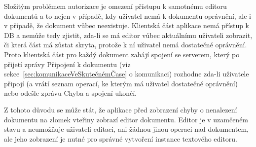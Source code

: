Složitým problémem autorizace je omezení přístupu k samotnému editoru dokumentů a to nejen v případě, kdy uživatel nemá k dokumentu oprávnění, ale i v případě, že dokument vůbec neexistuje.
Klientská část aplikace nemá přístup k DB a nemůže tedy zjistit, zda-li se má editor vůbec aktuálnímu uživateli zobrazit, či která část má zůstat skryta, protože k ní uživatel nemá dostatečné oprávnění.
Proto klientská část pro každý dokument zahájí spojení se serverem, který po přijetí zprávy Připojení k dokumentu (viz sekce~\ref{sec:komunikaceVeSkutečnémČase} o komunikaci) rozhodne zda-li uživatele připojí (a vrátí seznam operací, ke kterým má uživatel dostatečné oprávnění) nebo odešle zprávu Chyba a spojení ukončí.

Z tohoto důvodu se může stát, že aplikace před zobrazení chyby o nenalezení dokumentu na zlomek vteřiny zobrazí editor dokumentu.
Editor je v uzamčeném stavu a neumožňuje uživateli editaci, ani žádnou jinou operaci nad dokumentem, ale jeho zobrazení je nutné pro správné vytvoření instance textového editoru.
